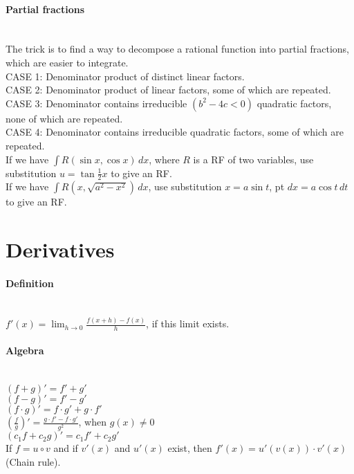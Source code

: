 \documentclass[10pt]{article}
\begin{document}
\paragraph{Partial fractions}\ \\
The trick is to find a way to decompose a rational function into partial fractions, which are easier to integrate.\\
CASE 1: Denominator product of distinct linear factors.\\
CASE 2: Denominator product of linear factors, some of which are repeated.\\
CASE 3: Denominator contains irreducible $(b^2 - 4c < 0)$ quadratic factors, none of which are repeated.\\
CASE 4: Denominator contains irreducible quadratic factors, some of which are repeated.\\
If we have $\int R(\sin x, \cos x)\,dx$, where $R$ is a RF of two variables, use substitution $u = \tan \frac{1}{2} x$ to give an RF.\\
If we have $\int R(x, \sqrt{a^2 - x^2})\,dx$, use substitution $x = a \sin t$,  pt $dx = a \cos t\,dt$ to give an RF.



\bigskip\bigskip
\section{Derivatives}\smallskip

\paragraph{Definition}\ \\
$f'(x) = \lim_{h \to 0} \frac{f(x+h)-f(x)}{h}$, if this limit exists.

\paragraph{Algebra}\ \\
$(f+g)' = f' + g'$\\
$(f-g)' = f' - g'$\\
$(f \cdot g)' = f \cdot g' + g \cdot f'$\\
$(\frac{f}{g})' = \frac{g \cdot f' - f \cdot g'}{g^2}$, when $g(x) \neq 0$\\
$(c_1f + c_2g)' = c_1f' + c_2g'$\\
If $f = u \circ v$ and if $v'(x)$ and $u'(x)$ exist, then $f'(x) = u'(v(x)) \cdot v'(x)$ (Chain rule).
\end{document}
